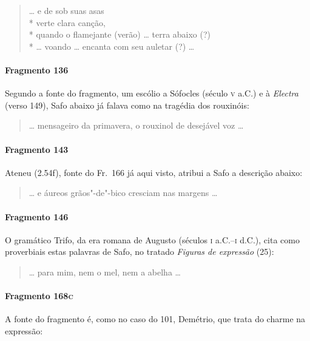 \begin{verse}
\ldots{} e de sob suas asas\\*
verte clara canção,\\*
quando o flamejante (verão) \ldots{} terra abaixo (?)\\*
\ldots{} voando \ldots{} encanta com seu auletar (?)  \ldots{}
\end{verse}

\paragraph{Fragmento 136}

{\small Segundo a fonte do fragmento, um escólio a Sófocles (século \textsc{v} a.C.) e à
\textit{Electra }(verso 149), Safo abaixo já falava como na tragédia dos
rouxinóis:}

\begin{verse}
\ldots{} mensageiro da primavera, o rouxinol de desejável voz \ldots{}
\end{verse}

\paragraph{Fragmento 143}

{\small Ateneu (2.54f), fonte do Fr.~166 já aqui visto, atribui a Safo a descrição abaixo:}

\begin{verse}
\ldots{} e áureos grãos"-de"-bico cresciam nas margens \ldots{}
\end{verse}

\paragraph{Fragmento 146}

{\small O gramático Trifo, da era romana de Augusto (séculos \textsc{i} a.C.--\textsc{i} d.C.), 
cita como proverbiais estas palavras de Safo, no tratado \textit{Figuras de expressão} (25):}

\begin{verse}
\ldots{} para mim, nem o mel, nem a abelha \ldots{}
\end{verse}

\paragraph{Fragmento 168\textsc{c}}

{\small A fonte do fragmento é, como no caso do 101, Demétrio, que trata do charme na
expressão:}

